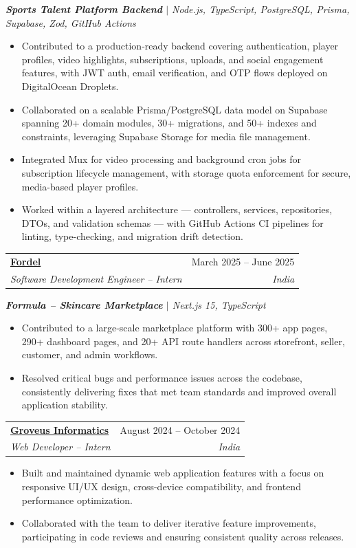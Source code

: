 \documentclass[letterpaper,11pt]{article}
\makeatletter
\newcommand{\resumeItem}[1]{
  \item\small{
    {#1 \vspace{-2pt}}
  }
}
\newcommand{\resumeSubheading}[4]{
  \vspace{-2pt}\item
    \begin{tabular*}{0.97\textwidth}[t]{l@{\extracolsep{\fill}}r}
      \textbf{#1} & #2 \\
      \textit{\small#3} & \textit{\small #4} \\
    \end{tabular*}\vspace{-7pt}
}
\newcommand{\resumeItemListStart}{\begin{itemize}}
\newcommand{\resumeItemListEnd}{\end{itemize}\vspace{-5pt}}
\makeatother
\begin{document}
      \vspace{3pt}
      \textit{\small\textbf{Sports Talent Platform Backend} $|$ Node.js, TypeScript, PostgreSQL, Prisma, Supabase, Zod, GitHub Actions}
      \resumeItemListStart
        \resumeItem{Contributed to a production-ready backend covering authentication, player profiles, video highlights, subscriptions, uploads, and social engagement features, with JWT auth, email verification, and OTP flows deployed on DigitalOcean Droplets.}
        \resumeItem{Collaborated on a scalable Prisma/PostgreSQL data model on Supabase spanning 20+ domain modules, 30+ migrations, and 50+ indexes and constraints, leveraging Supabase Storage for media file management.}
        \resumeItem{Integrated Mux for video processing and background cron jobs for subscription lifecycle management, with storage quota enforcement for secure, media-based player profiles.}
        \resumeItem{Worked within a layered architecture — controllers, services, repositories, DTOs, and validation schemas — with GitHub Actions CI pipelines for linting, type-checking, and migration drift detection.}
      \resumeItemListEnd

    \resumeSubheading
      {\href{https://fordelstudios.com/}{Fordel}}{March 2025 -- June 2025}
      {Software Development Engineer -- Intern}{India}

      \vspace{2pt}
      \textit{\small\textbf{Formula – Skincare Marketplace} $|$ Next.js 15, TypeScript}
      \resumeItemListStart
        \resumeItem{Contributed to a large-scale marketplace platform with 300+ app pages, 290+ dashboard pages, and 20+ API route handlers across storefront, seller, customer, and admin workflows.}
        \resumeItem{Resolved critical bugs and performance issues across the codebase, consistently delivering fixes that met team standards and improved overall application stability.}
      \resumeItemListEnd

    \resumeSubheading
      {\href{https://www.groveus.com/}{Groveus Informatics}}{August 2024 -- October 2024}
      {Web Developer -- Intern}{India}
      \resumeItemListStart
        \resumeItem{Built and maintained dynamic web application features with a focus on responsive UI/UX design, cross-device compatibility, and frontend performance optimization.}
        \resumeItem{Collaborated with the team to deliver iterative feature improvements, participating in code reviews and ensuring consistent quality across releases.}
      \resumeItemListEnd
\end{document}
